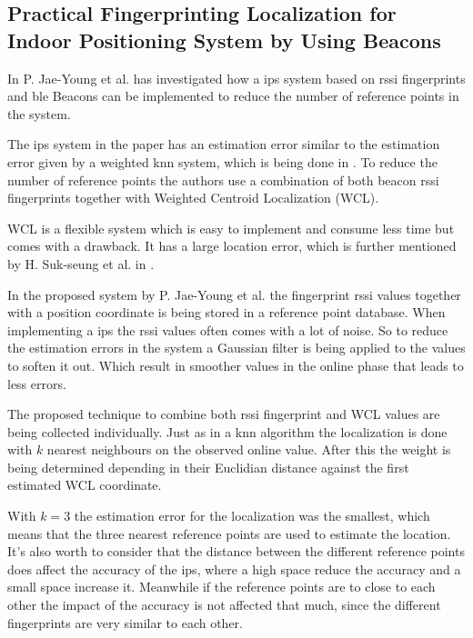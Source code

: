 \subsection{Practical Fingerprinting Localization for Indoor Positioning System by Using Beacons}\label{sec:}
In \cite{PracticalFingerprintingLocalization2017} P. Jae-Young et al. has investigated how a \acrshort{ips} system based on \acrshort{rssi} fingerprints and \acrshort{ble} Beacons can be implemented to reduce the number of reference points in the system.

\bigskip

The \acrshort{ips} system in the paper has an estimation error similar to the estimation error given by a weighted \acrshort{knn} system, which is being done in \cite{ImprovingIndoorLocalization2016}.
To reduce the number of reference points the authors use a combination of both beacon \acrshort{rssi} fingerprints together with Weighted Centroid Localization (WCL). 

\bigskip

WCL is a flexible system which is easy to implement and consume less time but comes with a drawback. 
It has a large location error, which is further mentioned by H. Suk-seung et al. in \cite{BeaconBasedIndoor2016}.

\bigskip

In the proposed system by P. Jae-Young et al. the fingerprint \acrshort{rssi} values together with a position coordinate is being stored in a reference point database.
When implementing a \acrshort{ips} the \acrshort{rssi} values often comes with a lot of noise.
So to reduce the estimation errors in the system a Gaussian filter is being applied to the values to soften it out.
Which result in smoother values in the online phase that leads to less errors.  
\bigskip

The proposed technique to combine both \acrshort{rssi} fingerprint and WCL values are being collected individually.
Just as in a \acrshort{knn} algorithm the localization is done with $k$ nearest neighbours on the observed online value.
After this the weight is being determined depending in their Euclidian distance against the first estimated WCL coordinate.

\bigskip

With $k=3$ the estimation error for the localization was the smallest, which means that the three nearest reference points are used to estimate the location.
It's also worth to consider that the distance between the different reference points does affect the accuracy of the \acrshort{ips}, where a high space reduce the accuracy and a small space increase it.
Meanwhile if the reference points are to close to each other the impact of the accuracy is not affected that much, since the different fingerprints are very similar to each other.

